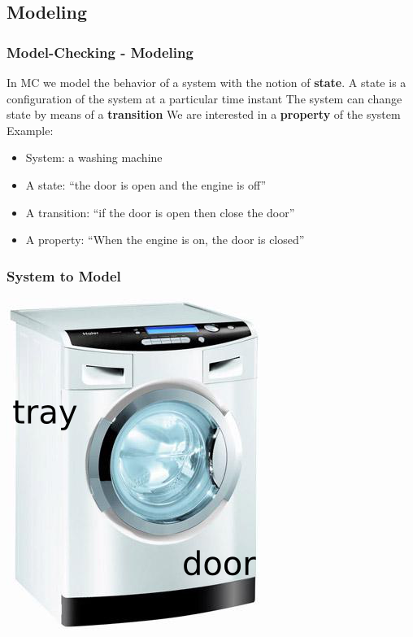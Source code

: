 \subsection{Modeling}

\begin{frame}
  \frametitle{Model-Checking - Modeling}

  In MC we model the behavior of a system with the
  notion of {\bf state}. A state is a configuration of
  the system at a particular time instant 
  \vfill
  The system can change state by means of a {\bf transition}
  \vfill
  We are interested in a {\bf property} of the system
  \vfill
  \pause
  Example:
  \begin{itemize}
    \item System: a washing machine
    \item A state: ``the door is open and the engine is off''
    \item A transition: ``if the door is open then close the door''
    \item A property: ``When the engine is on, the door is closed''
  \end{itemize}

\end{frame}

\begin{frame}
  \frametitle{System to Model}

  \begin{center}
  \includegraphics[scale=.67]{imgs/cheap-washing-machine-edit.png}
  \end{center}

\end{frame}

